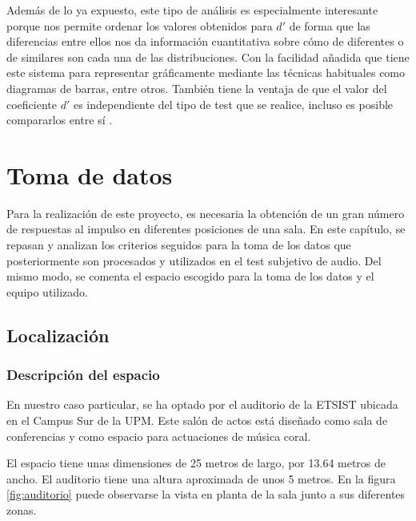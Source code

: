 \documentclass[11pt,a4paper]{book}
\begin{document}
            Además de lo ya expuesto, este tipo de análisis es especialmente interesante porque nos permite ordenar los valores obtenidos para $d'$ de forma que las diferencias entre ellos nos da información cuantitativa sobre cómo de diferentes o de similares son cada una de las distribuciones. Con la facilidad añadida que tiene este sistema para representar gráficamente mediante las técnicas habituales como diagramas de barras, entre otros. También tiene la ventaja de que el valor del coeficiente $d'$ es independiente del tipo de test que se realice, incluso es posible compararlos entre sí \cite{delaPrida2021}.
            

\chapter{Toma de datos}
	Para la realización de este proyecto, es necesaria la obtención de un gran número de respuestas al impulso en diferentes posiciones de una sala. En este capítulo, se repasan y analizan los criterios seguidos para la toma de los datos que posteriormente son procesados y utilizados en el test subjetivo de audio. Del mismo modo, se comenta el espacio escogido para la toma de los datos y el equipo utilizado.

	\section{Localización}

		\subsection{Descripción del espacio}

 			En nuestro caso particular, se ha optado por el auditorio de la ETSIST ubicada en el Campus Sur de la UPM. Este salón de actos está diseñado como sala de conferencias y como espacio para actuaciones de música coral. 
 
 			El espacio tiene unas dimensiones de 25 metros de largo, por 13.64 metros de ancho. El auditorio tiene una altura aproximada de unos 5 metros. En la figura \ref{fig:auditorio} puede observarse la vista en planta de la sala junto a sus diferentes zonas.
 			
\end{document}
